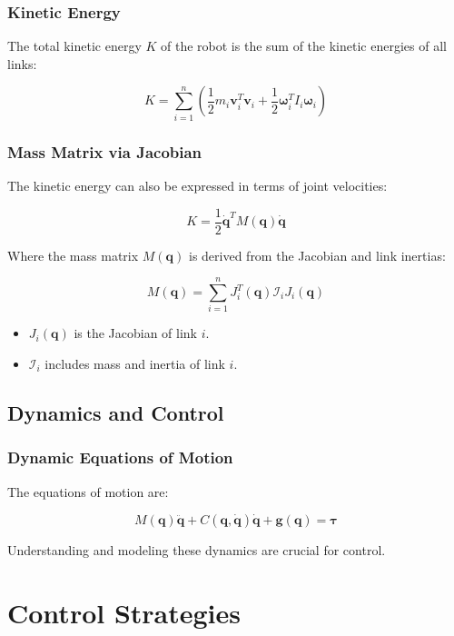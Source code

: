 \documentclass{article}
\begin{document}
\subsubsection{Kinetic Energy}

The total kinetic energy $K$ of the robot is the sum of the kinetic energies of all links:

$$
K = \sum_{i=1}^{n} \left( \frac{1}{2} m_i \mathbf{v}_i^T \mathbf{v}_i + \frac{1}{2} \bm{\omega}_i^T I_i \bm{\omega}_i \right)
$$

\subsubsection{Mass Matrix via Jacobian}

The kinetic energy can also be expressed in terms of joint velocities:

$$
K = \frac{1}{2} \dot{\mathbf{q}}^T M(\mathbf{q}) \dot{\mathbf{q}}
$$

Where the mass matrix $M(\mathbf{q})$ is derived from the Jacobian and link inertias:

$$
M(\mathbf{q}) = \sum_{i=1}^{n} J_i^T(\mathbf{q}) \mathcal{I}_i J_i(\mathbf{q})
$$

\begin{itemize}
    \item $J_i(\mathbf{q})$ is the Jacobian of link $i$.
    \item $\mathcal{I}_i$ includes mass and inertia of link $i$.
\end{itemize}

\subsection{Dynamics and Control}

\subsubsection{Dynamic Equations of Motion}

The equations of motion are:

$$
M(\mathbf{q}) \ddot{\mathbf{q}} + C(\mathbf{q}, \dot{\mathbf{q}}) \dot{\mathbf{q}} + \mathbf{g}(\mathbf{q}) = \bm{\tau}
$$

Understanding and modeling these dynamics are crucial for control.

\section{Control Strategies}
\end{document}
